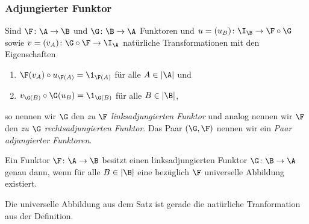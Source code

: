 \documentclass[serif,9pt]{beamer}
\begin{document}
\begin{frame}
  \frametitle{Adjungierter Funktor}

\pause
  \begin{defn*}
  Sind $\F \colon \A \to \B$ und $\G \colon \B \to \A$ Funktoren und $u = (u_B) \colon \I_\B \to \F \circ \G$ sowie $v = (v_A) \colon \G \circ \F \to \I_\A$ natürliche Transformationen mit den Eigenschaften
  \begin{enumerate}[(1)]
    \item $\F(v_A) \circ u_{\F(A)} = \1_{\F(A)}$ für alle $A \in |\A|$ und
    \item $v_{\G(B)} \circ \G(u_B) = \1_{\G(B)}$ für alle $B \in |\B|$,
  \end{enumerate}
  so nennen wir $\G$ den \emph{zu $\F$ linksadjungierten Funktor} und analog nennen wir $\F$ den \emph{zu $\G$ rechtsadjungierten Funktor}.
  Das Paar $(\G, \F)$ nennen wir ein \emph{Paar adjungierter Funktoren}.
\end{defn*}

\pause

  \begin{thm*}
    Ein Funktor $\F \colon \A \to \B$ besitzt einen linksadjungierten Funktor $\G \colon \B \to \A$ genau dann, wenn für alle $B \in |\B|$ eine bezüglich $\F$ universelle Abbildung existiert.
  \end{thm*}

\pause

  \begin{bem}
    Die universelle Abbildung aus dem Satz ist gerade die natürliche Tranformation aus der Definition.
  \end{bem}
\end{frame}
\end{document}
